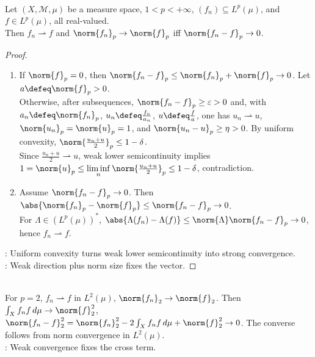 \begin{theorem} \label{thm:radon-riesz-lp} \\
Let $(X,\mathcal M,\mu)$ be a measure space, $1<p<+\infty$, $(f_n)\subseteq L^p(\mu)$, and $f\in L^p(\mu)$, all real-valued.\\
Then $f_n\rightharpoonup f$ and $\norm{f_n}_p\to\norm{f}_p$ iff $\norm{f_n-f}_p\to0$.
\begin{proof}
\begin{enumerate}[label=\roman*.]
\setlength{\itemsep}{0pt}
\item[$(\Rightarrow)$] If $\norm{f}_p=0$, then $\norm{f_n-f}_p\leq\norm{f_n}_p+\norm{f}_p\to0$. Let $a\defeq\norm{f}_p>0$.\\
Otherwise, after subsequences, $\norm{f_n-f}_p\geq\varepsilon>0$ and, with $a_n\defeq\norm{f_n}_p$, $u_n\defeq\frac{f_n}{a_n}$, $u\defeq\frac{f}{a}$, one has $u_n\rightharpoonup u$, $\norm{u_n}_p=\norm{u}_p=1$, and $\norm{u_n-u}_p\geq\eta>0$. By uniform convexity, $\norm{\frac{u_n+u}{2}}_p\leq1-\delta$.\\
Since $\frac{u_n+u}{2}\rightharpoonup u$, weak lower semicontinuity implies $1=\norm{u}_p\leq\liminf\limits_n\norm{\frac{u_n+u}{2}}_p\leq1-\delta$, contradiction.
\item[$(\Leftarrow)$] Assume $\norm{f_n-f}_p\to0$. Then $\abs{\norm{f_n}_p-\norm{f}_p}\leq\norm{f_n-f}_p\to0$.\\
For $\Lambda\in(L^p(\mu))^*$, $\abs{\Lambda(f_n)-\Lambda(f)}\leq\norm{\Lambda}\norm{f_n-f}_p\to0$, hence $f_n\rightharpoonup f$.
\end{enumerate}
: Uniform convexity turns weak lower semicontinuity into strong convergence.\\
: Weak direction plus norm size fixes the vector.
\end{proof}
\end{theorem}

\begin{remark} \label{rem:radon-riesz-l2-proof-identity} \\
For $p=2$, $f_n\rightharpoonup f$ in $L^2(\mu)$, $\norm{f_n}_2\to\norm{f}_2$. Then $\int_Xf_nf\,d\mu\to\norm{f}_2^2$,\\
$\norm{f_n-f}_2^2=\norm{f_n}_2^2-2\int_Xf_nf\,d\mu+\norm{f}_2^2\to0$. The converse follows from norm convergence in $L^2(\mu)$.\\
: Weak convergence fixes the cross term.
\end{remark}

